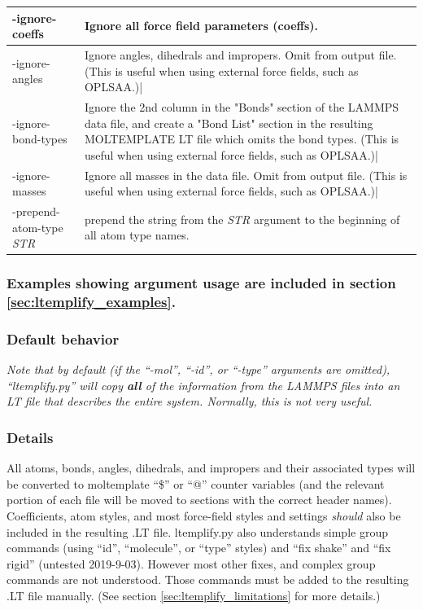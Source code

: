 \documentclass[11pt]{article}
\begin{document}
\begin{tabular}[h]{l|p{10cm}}
-ignore-coeffs
&
Ignore all force field parameters (coeffs).
\\
\hline

-ignore-angles
&
Ignore angles, dihedrals and impropers.  Omit from output file.
(This is useful when using external force fields, such as OPLSAA.)|
\\
\hline

-ignore-bond-types
&
Ignore the 2nd column in the "Bonds" section of the LAMMPS data file,
and create a "Bond List" section in the resulting MOLTEMPLATE LT file
which omits the bond types.
(This is useful when using external force fields, such as OPLSAA.)|
\\
\hline

-ignore-masses
&
Ignore all masses in the data file.  Omit from output file.
(This is useful when using external force fields, such as OPLSAA.)|
\\
\hline

-prepend-atom-type \textit{STR}
&
prepend the string from the \textit{STR} argument to the beginning of
all atom type names.
\\
\hline
\end{tabular}


\subsubsection*{Examples showing argument usage are included
                in section \ref{sec:ltemplify_examples}.}

\pagebreak


\subsubsection*{Default behavior}
\textit{Note that by default
(if the ``-mol'', ``-id'', or ``-type'' arguments are omitted),
``ltemplify.py'' will copy \textbf{all} of the information
from the LAMMPS files into an LT file that describes the entire system.
Normally, this is not very useful.}



\subsubsection*{Details}

All atoms, bonds, angles, dihedrals, and impropers and their associated
types will be converted to moltemplate ``\$'' or ``@'' counter variables
(and the relevant portion of each file will be moved to sections
with the correct header names).
Coefficients, atom styles, and most force-field styles and
settings \textit{should} also be included in the resulting .LT file.
ltemplify.py also understands simple group commands
(using ``id'', ``molecule'', or ``type'' styles)
and ``fix shake'' and ``fix rigid''  (untested 2019-9-03).
However most other fixes, and complex group commands are not understood.
Those commands must be added to the resulting .LT file manually.
(See section \ref{sec:ltemplify_limitations} for more details.)
\end{document}
